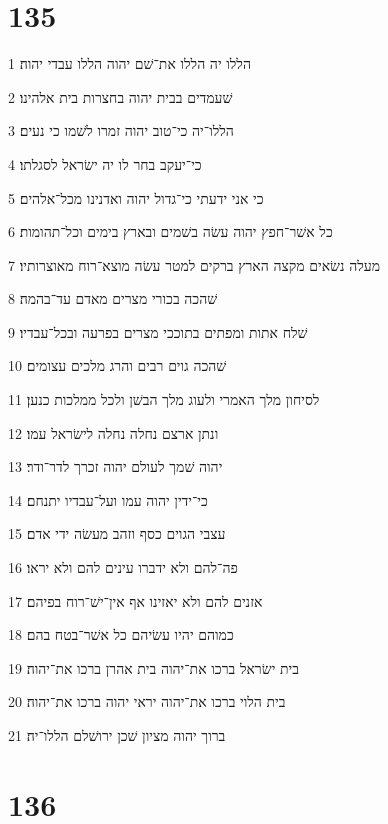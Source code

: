 \chapter{135}

\par 1 הללו יה הללו את־שׁם יהוה הללו עבדי יהוה׃
\par 2 שׁעמדים בבית יהוה בחצרות בית אלהינו׃
\par 3 הללו־יה כי־טוב יהוה זמרו לשׁמו כי נעים׃
\par 4 כי־יעקב בחר לו יה ישׂראל לסגלתו׃
\par 5 כי אני ידעתי כי־גדול יהוה ואדנינו מכל־אלהים׃
\par 6 כל אשׁר־חפץ יהוה עשׂה בשׁמים ובארץ בימים וכל־תהומות׃
\par 7 מעלה נשׂאים מקצה הארץ ברקים למטר עשׂה מוצא־רוח מאוצרותיו׃
\par 8 שׁהכה בכורי מצרים מאדם עד־בהמה׃
\par 9 שׁלח אתות ומפתים בתוככי מצרים בפרעה ובכל־עבדיו׃
\par 10 שׁהכה גוים רבים והרג מלכים עצומים׃
\par 11 לסיחון מלך האמרי ולעוג מלך הבשׁן ולכל ממלכות כנען׃
\par 12 ונתן ארצם נחלה נחלה לישׂראל עמו׃
\par 13 יהוה שׁמך לעולם יהוה זכרך לדר־ודר׃
\par 14 כי־ידין יהוה עמו ועל־עבדיו יתנחם׃
\par 15 עצבי הגוים כסף וזהב מעשׂה ידי אדם׃
\par 16 פה־להם ולא ידברו עינים להם ולא יראו׃
\par 17 אזנים להם ולא יאזינו אף אין־ישׁ־רוח בפיהם׃
\par 18 כמוהם יהיו עשׂיהם כל אשׁר־בטח בהם׃
\par 19 בית ישׂראל ברכו את־יהוה בית אהרן ברכו את־יהוה׃
\par 20 בית הלוי ברכו את־יהוה יראי יהוה ברכו את־יהוה׃
\par 21 ברוך יהוה מציון שׁכן ירושׁלם הללו־יה׃

\chapter{136}

